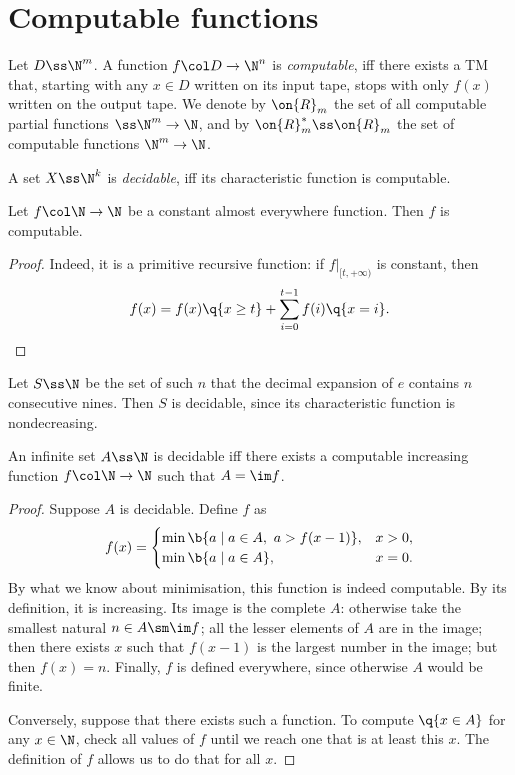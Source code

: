 \section{Computable functions}

\newcommand{\Comp}[0]{\on{R}}

\begin{definition}
  Let $D \ss \N^m$.
  A function $f \col D \to \N^n$ is \emph{computable}, iff there exists a TM that, starting with any $x \in D$ written on its input tape, stops with only $f(x)$ written on the output tape.
  We denote by $\Comp_m$ the set of all computable partial functions ${\ss\N^m} \to \N$, and by $\Comp_m^* \ss \Comp_m$ the set of computable functions $\N^m \to \N$.
\end{definition}

\begin{definition}
  A set $X \ss \N^k$ is \emph{decidable}, iff its characteristic function is computable.
\end{definition}

\begin{lemma}
  Let $f \col \N \to \N$ be a constant almost everywhere function. Then $f$ is computable.
\end{lemma}

\begin{proof}
  Indeed, it is a primitive recursive function: if $f|_{[t, +\infty)}$ is constant, then
  $$ f(x) = f(x) \q{x \ge t} + \sum_{i=0}^{t-1} f(i) \q{x=i}. $$
\end{proof}

\begin{example}
  Let $S \ss \N$ be the set of such $n$ that the decimal expansion of $e$ contains $n$ consecutive nines.
  Then $S$ is decidable, since its characteristic function is nondecreasing. 
\end{example}

\begin{lemma}
  An infinite set $A \ss \N$ is decidable iff there exists a computable increasing function $f \col \N \to \N$ such that $A = \im f$.
\end{lemma}

\begin{proof}
  Suppose $A$ is decidable. Define $f$ as 
  $$
  f(x)=
  \begin{cases}
    \min \b{a \mid a \in A,\ a > f(x-1)}, & x > 0, \\
    \min \b{a \mid a \in A}, & x = 0.
  \end{cases}
  $$
  By what we know about minimisation, this function is indeed computable.
  By its definition, it is increasing.
  Its image is the complete $A$: otherwise take the smallest natural $n \in A \sm \im f$; all the lesser elements of $A$ are in the image; then there exists $x$ such that $f(x-1)$ is the largest number in the image; but then $f(x) = n$. Finally, $f$ is defined everywhere, since otherwise $A$ would be finite.
  
  Conversely, suppose that there exists such a function.
  To compute $\q{x \in A}$ for any $x \in \N$, check all values of $f$ until we reach one that is at least this $x$. The definition of $f$ allows us to do that for all $x$.
\end{proof}

